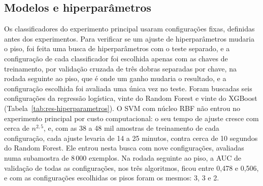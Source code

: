 \subsection{Modelos e hiperparâmetros}
\label{sec:res-modelos}

Os classificadores do experimento principal usaram configurações fixas, definidas antes dos experimentos. Para verificar se um ajuste de hiperparâmetros mudaria o piso, foi feita uma busca de hiperparâmetros com o teste separado, e a configuração de cada classificador foi escolhida apenas com as chaves de treinamento, por validação cruzada de três dobras separadas por chave, na rodada seguinte ao piso, que é onde um ganho mudaria o resultado, e a configuração escolhida foi avaliada uma única vez no teste. Foram buscadas seis configurações da regressão logística, vinte do Random Forest e vinte do XGBoost (Tabela~\ref{tab:res-hiperparametros}). O SVM com núcleo RBF não entrou no experimento principal por custo computacional: o seu tempo de ajuste cresce com cerca de $n^{2{,}5}$, e, com as 38 a 48 mil amostras de treinamento de cada configuração, cada ajuste levaria de 14 a 25 minutos, contra cerca de 10 segundos do Random Forest. Ele entrou nesta busca com nove configurações, avaliadas numa subamostra de 8\,000 exemplos. Na rodada seguinte ao piso, a AUC de validação de todas as configurações, nos três algoritmos, ficou entre 0,478 e 0,506, e com as configurações escolhidas os pisos foram os mesmos: 3, 3 e 2.

